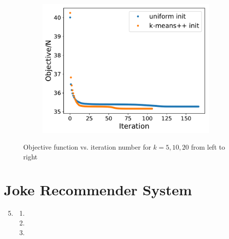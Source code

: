 \documentclass[11pt,letterpaper]{article}
\theoremstyle{definition}
\theoremstyle{plain}
\numberwithin{equation}{section}
\numberwithin{figure}{section}
\begin{document}
\begin{enumerate}
\begin{enumerate}
\begin{figure}[H]
\begin{subfigure}[t]{.32\textwidth}
				\includegraphics[width=\textwidth]{figures/20-objective.pdf}
			\end{subfigure}

			\caption{Objective function vs. iteration number for $k = 5,10,20$ from left to right}
		\end{figure}
		\label{fig:km_objs}
	\end{enumerate}
\end{enumerate}
















\section{Joke Recommender System}
\begin{enumerate}
\setcounter{enumi}{4}
	\item \begin{enumerate}
		\item
		\item 
		\item 
	\end{enumerate}
\end{enumerate}





\clearpage

\clearpage

\clearpage

\clearpage

\end{document}

